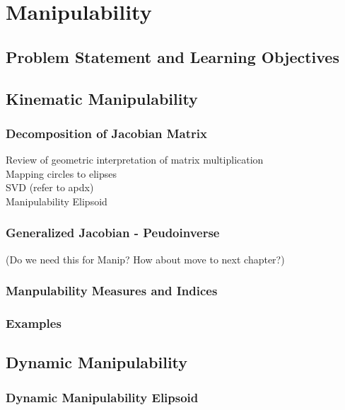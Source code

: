 %

\chapter{Manipulability}

\section{Problem Statement and Learning Objectives}



\section{Kinematic Manipulability}

\subsection{Decomposition of Jacobian Matrix}

Review of geometric interpretation of matrix multiplication\\
Mapping circles to elipses\\
SVD (refer to apdx)\\
Manipulability Elipsoid

\subsection{Generalized Jacobian - Peudoinverse}
(Do we need this for Manip?  How about move to next chapter?)

\subsection{Manpulability Measures and Indices}

\subsection{Examples}


\section{Dynamic Manipulability}
 \subsection{Dynamic Manipulability Elipsoid}
